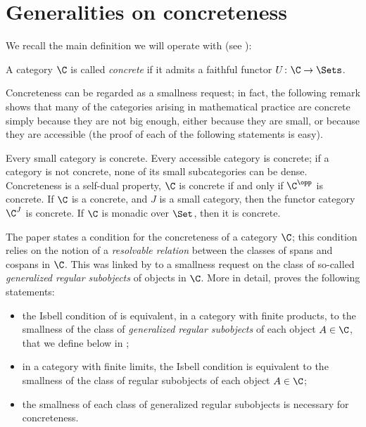 \section{Generalities on concreteness}
We recall the main definition we will operate with (see \cite{Bor1,McL}):
\begin{definition}\label{concrecat} A category $\C$ is called \emph{concrete} if
it admits a faithful functor $U\colon \C \to \Sets$.
\end{definition} Concreteness can be regarded as a smallness request; in fact,
the following remark shows that many of the categories arising in mathematical
practice are concrete simply because they are not big enough, either because
they are small, or because they are accessible (the proof of each of the
following statements is easy).
\begin{remark}\label{all-is-conc} Every small
category is concrete. Every accessible category is concrete; if a category is
not concrete, none of its small subcategories can be dense. Concreteness is a
self-dual property, \ie $\C$ is concrete if and only if $\C^\opp$ is concrete.
If $\C$ is a concrete, and $J$ is a small category, then the functor category
$\C^J$ is concrete. If $\C$ is monadic over $\Set$, then it is concrete.
\end{remark} 
The paper \cite{Isbell1964} states a condition for the concreteness of a category $\C$; this condition relies on the notion of a \emph{resolvable relation} between the classes of spans and cospans in $\C$. This was linked by \cite{freyd1973concreteness} to a smallness request on the class of so-called \emph{generalized regular subobjects} of objects in $\C$. More in detail, \cite{freyd1973concreteness} proves the following statements:
\begin{itemize}
	\item the Isbell condition of \cite{Isbell1964} is equivalent, in a category with finite products, to the smallness of the class of \emph{generalized regular subobjects} of each object $A\in\C$, that we define below in ;
	\item in a category with finite limits, the Isbell condition is equivalent to the smallness of the class of regular subobjects of each object $A\in\C$;
	\item the smallness of each class of generalized regular subobjects is necessary for concreteness.
\end{itemize}
